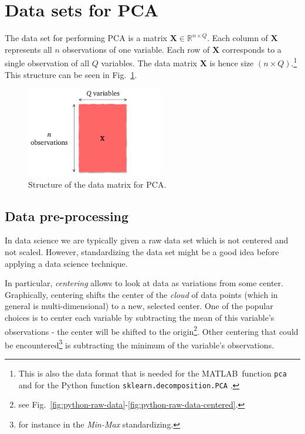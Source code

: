 \documentclass[10pt,twocolumn]{article}
\begin{document}
\section{Data sets for PCA}

The data set for performing PCA is a matrix $\mathbf{X} \in \mathbb{R}^{n \times Q}$. Each column of $\mathbf{X}$ represents all $n$ observations of one variable. Each row of $\mathbf{X}$ corresponds to a single observation of all $Q$ variables. The data matrix $\mathbf{X}$ is hence size $(n \times Q)$.\footnote{This is also the data format that is needed for the MATLAB\textregistered \, function \texttt{pca} \cite{Matlab-pca} and for the Python function \texttt{sklearn.decomposition.PCA} \cite{Python-pca}.} This structure can be seen in Fig.~\ref{fig:data-matrix}.

\begin{figure}[H]
\centering\includegraphics[width=6cm]{data-set-PCA.pdf}
\caption{Structure of the data matrix for PCA.}
\label{fig:data-matrix}
\end{figure}

\subsection{Data pre-processing}

In data science we are typically given a raw data set which is not centered and not scaled. However, standardizing the data set might be a good idea before applying a data science technique.

In particular, \textit{centering} allows to look at data as variations from some center. Graphically, centering shifts the center of the \textit{cloud} of data points (which in general is multi-dimensional) to a new, selected center. One of the popular choices is to center each variable by subtracting the mean of this variable's observations - the center will be shifted to the origin\footnote{see Fig.~\ref{fig:python-raw-data}-\ref{fig:python-raw-data-centered}.}.
Other centering that could be encountered\footnote{for instance in the \textit{Min-Max} standardizing.} is subtracting the minimum of the variable's observations.
\end{document}
